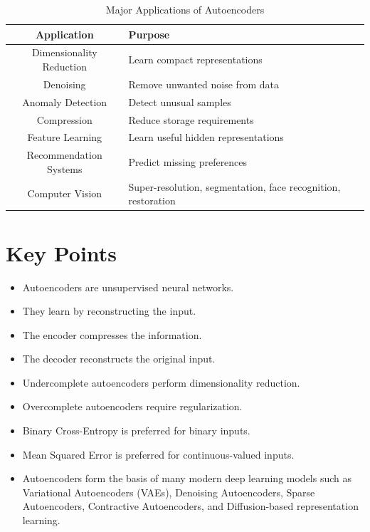\documentclass{article}
\begin{document}
	\begin{table}[H]
		\centering
		\caption{Major Applications of Autoencoders}
		\begin{tabular}{|c|p{8cm}|}
			\hline
			Application & Purpose\\
			\hline
			Dimensionality Reduction & Learn compact representations\\
			\hline
			Denoising & Remove unwanted noise from data\\
			\hline
			Anomaly Detection & Detect unusual samples\\
			\hline
			Compression & Reduce storage requirements\\
			\hline
			Feature Learning & Learn useful hidden representations\\
			\hline
			Recommendation Systems & Predict missing preferences\\
			\hline
			Computer Vision & Super-resolution, segmentation, face recognition, restoration\\
			\hline
		\end{tabular}
	\end{table}
	
	\section{Key Points}
	
	\begin{itemize}
		\item Autoencoders are unsupervised neural networks.
		
		\item They learn by reconstructing the input.
		
		\item The encoder compresses the information.
		
		\item The decoder reconstructs the original input.
		
		\item Undercomplete autoencoders perform dimensionality reduction.
		
		\item Overcomplete autoencoders require regularization.
		
		\item Binary Cross-Entropy is preferred for binary inputs.
		
		\item Mean Squared Error is preferred for continuous-valued inputs.
		
		\item Autoencoders form the basis of many modern deep learning models such as
		Variational Autoencoders (VAEs), Denoising Autoencoders, Sparse Autoencoders,
		Contractive Autoencoders, and Diffusion-based representation learning.
	\end{itemize}
	
\end{document}

